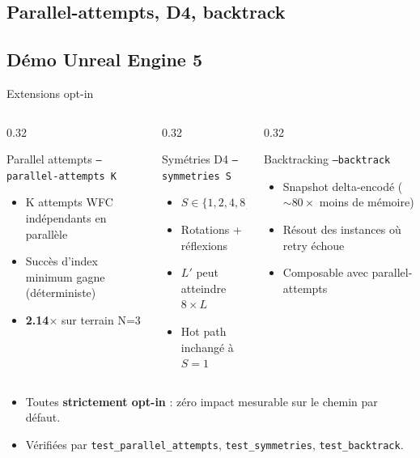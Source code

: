 \documentclass[aspectratio=169,11pt]{beamer}
\begin{document}
\subsection{Parallel-attempts, D4, backtrack}
\subsection{Démo Unreal Engine 5}

\begin{frame}{Extensions opt-in}
\begin{columns}[T]
\begin{column}{0.32\textwidth}
\begin{block}{Parallel attempts}
\texttt{--parallel-attempts K}
\begin{itemize}
\footnotesize
    \item K attempts WFC indépendants en parallèle
    \item Succès d'index minimum gagne (déterministe)
    \item \textbf{2.14$\times$} sur terrain N=3
\end{itemize}
\end{block}
\end{column}
\begin{column}{0.32\textwidth}
\begin{block}{Symétries D4}
\texttt{--symmetries S}
\begin{itemize}
\footnotesize
    \item $S \in \{1,2,4,8\}$
    \item Rotations + réflexions
    \item $L'$ peut atteindre $8 \times L$
    \item Hot path inchangé à $S=1$
\end{itemize}
\end{block}
\end{column}
\begin{column}{0.32\textwidth}
\begin{block}{Backtracking}
\texttt{--backtrack}
\begin{itemize}
\footnotesize
    \item Snapshot delta-encodé ($\sim 80\times$ moins de mémoire)
    \item Résout des instances où retry échoue
    \item Composable avec parallel-attempts
\end{itemize}
\end{block}
\end{column}
\end{columns}

\vspace{0.4cm}

\begin{itemize}
    \item Toutes \textbf{strictement opt-in} : zéro impact mesurable sur le chemin par défaut.
    \item Vérifiées par \texttt{test\_parallel\_attempts}, \texttt{test\_symmetries}, \texttt{test\_backtrack}.
\end{itemize}
\end{frame}
\end{document}
